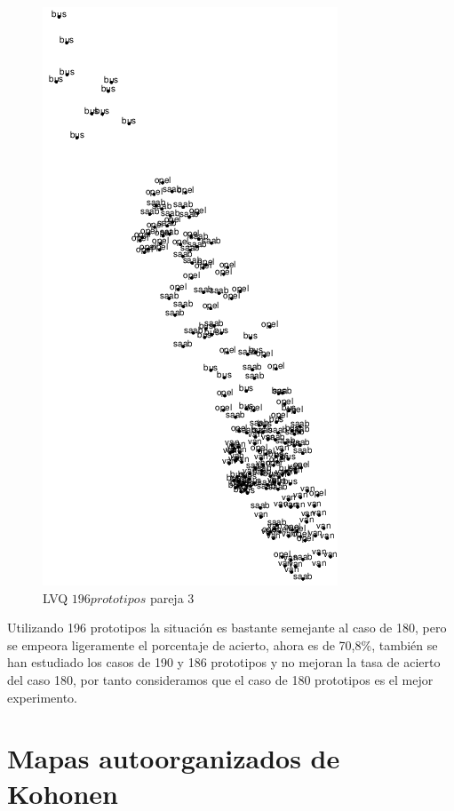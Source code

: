 \documentclass[11pt,spanish,listoffigures,listoftables]{workluis}
\begin{document}
\begin{figure}[H]
\centering
\includegraphics[scale=0.5]{lvq196p3}
\caption{LVQ $196 prototipos$ pareja 3}
\end{figure} 

\par Utilizando 196 prototipos la situación es bastante semejante al caso de 180, pero se empeora ligeramente el porcentaje de acierto, ahora es de 70,8\%, también se han estudiado los casos de 190 y 186 prototipos y no mejoran la tasa de acierto del caso 180, por tanto consideramos que el caso de 180 prototipos es el mejor experimento.


\chapter{Mapas autoorganizados de Kohonen}
\end{document}
